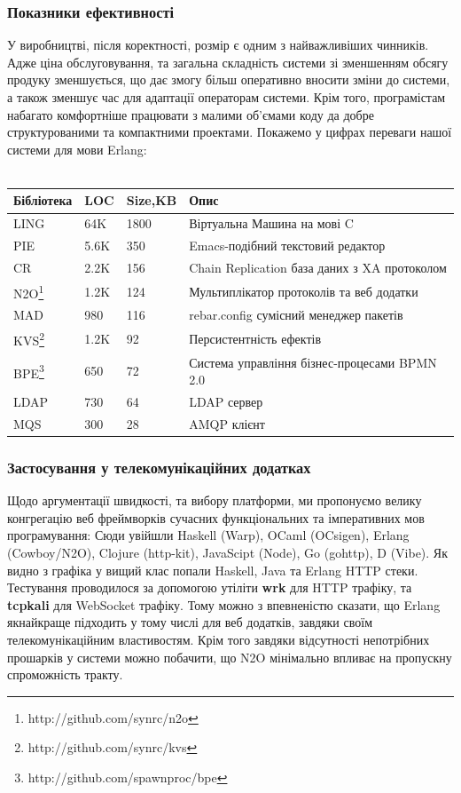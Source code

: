 \documentclass[11pt,oneside]{article}
\begin{document}
\subsubsection*{Показники ефективності}
   У виробництві, після коректності, розмір є одним з найважливіших чинників.
   Адже ціна обслуговування, та загальна складність системи зі зменшенням обсягу продуку
   зменшується, що дає змогу більш оперативно вносити зміни до системи, а також
   зменшує час для адаптації операторам системи. Крім того, програмістам набагато
   комфортніше працювати з малими об’ємами коду да добре структурованими та компактними проектами.
   Покажемо у цифрах переваги нашої системи для мови Erlang:
   \\
   \\

\begin{center}
    \begin{tabular}{ | l | l | l | p{9cm} |}
    \hline
    Бібліотека & LOC  & Size,KB  & Опис \\ \hline
          LING & 64K  & 1800 & Віртуальна Машина на мові C\\
  \hline
           PIE & 5.6K & 350  & Emacs-подібний текстовий редактор\\
           CR  & 2.2K & 156  & Chain Replication база даних з XA протоколом\\
           N2O\footnote{http://github.com/synrc/n2o} & 1.2K & 124  & Мультиплікатор протоколів та веб додатки\\
           MAD & 980  & 116  & rebar.config сумісний менеджер пакетів \\
           KVS\footnote{http://github.com/synrc/kvs} & 1.2K & 92   & Персистентність ефектів\\
           BPE\footnote{http://github.com/spawnproc/bpe} & 650  & 72   & Система управління бізнес-процесами BPMN 2.0\\
          LDAP & 730  & 64   & LDAP сервер\\
           MQS & 300  & 28   & AMQP клієнт\\
  \hline
    \end{tabular}
\end{center}

\newpage
\subsubsection*{Застосування у телекомунікаційних додатках}
Щодо аргументації швидкості, та вибору платформи, ми пропонуємо велику конгрегацію
веб фреймворків сучасних функціональних та імперативних мов програмування: Сюди увійшли
Haskell (Warp), OCaml (OCsigen), Erlang (Cowboy/N2O), Clojure (http-kit), JavaScipt (Node), Go (gohttp), D (Vibe).
Як видно з графіка у вищий клас попали Haskell, Java та Erlang HTTP стеки.
Тестування проводилося за допомогою утіліти {\bf wrk} для HTTP трафіку, та {\bf tcpkali} для WebSocket трафіку.
Тому можно з впевненістю сказати, що Erlang якнайкраще підходить у тому числі для веб додатків,
завдяки своїм телекомунікаційним властивостям. Крім того завдяки відсутності непотрібних прошарків
у системи можно побачити, що N2O мінімально впливає на пропускну спроможність тракту.
\end{document}
